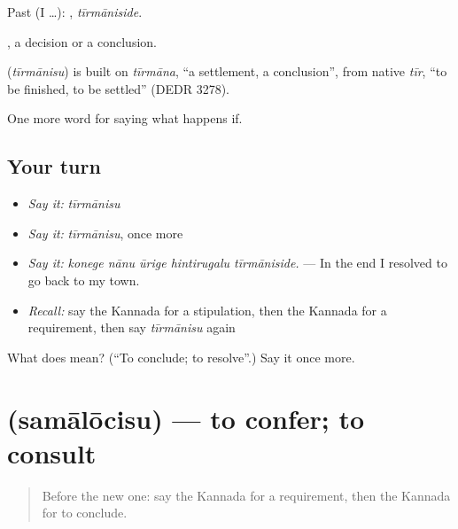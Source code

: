 Past (I …): , \emph{tīrmāniside}.

, a decision or a conclusion.

\begin{cousinweb}
\textbf{} (\emph{tīrmānisu}) is built on \emph{tīrmāna}, \textquotedblleft{}a settlement, a conclusion\textquotedblright{}, from native \emph{tīr}, \textquotedblleft{}to be finished, to be settled\textquotedblright{} (DEDR 3278).
\end{cousinweb}

\begin{grammarlens}[title={What you've built}]
One more word for saying what happens if.
\end{grammarlens}

\subsection*{Your turn}
\begin{itemize}
\raggedright
  \item \emph{Say it:} \emph{tīrmānisu}
  \item \emph{Say it:} \emph{tīrmānisu}, once more
  \item \emph{Say it:} \emph{konege nānu ūrige hintirugalu tīrmāniside.} — In the end I resolved to go back to my town.
  \item \emph{Recall:} say the Kannada for a stipulation, then the Kannada for a requirement, then say \emph{tīrmānisu} again
\end{itemize}

\begin{tcolorbox}[breakable,colback=teal!4,colframe=teal!35!black,title={Before you move on}]
What does  mean? (\textquotedblleft{}To conclude; to resolve\textquotedblright{}.) Say it once more.
\end{tcolorbox}
\section[\texorpdfstring{\kn{ಸಮಾಲೋಚಿಸು} (samālōcisu)}{ಸಮಾಲೋಚಿಸು (samālōcisu)}]{ (samālōcisu) — to confer; to consult}

\label{lesson:KA-C431-samalocisu}



\begin{quote}
Before the new one: say the Kannada for a requirement, then the Kannada for to conclude.
\end{quote}

